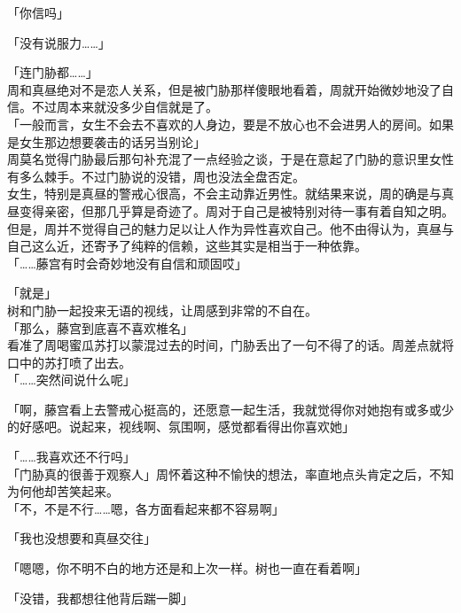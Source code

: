 「你信吗」

「没有说服力……」

「连门胁都……」\\

周和真昼绝对不是恋人关系，但是被门胁那样傻眼地看着，周就开始微妙地没了自信。不过周本来就没多少自信就是了。\\

「一般而言，女生不会去不喜欢的人身边，要是不放心也不会进男人的房间。如果是女生那边想要袭击的话另当别论」\\

周莫名觉得门胁最后那句补充混了一点经验之谈，于是在意起了门胁的意识里女性有多么棘手。不过门胁说的没错，周也没法全盘否定。\\

女生，特别是真昼的警戒心很高，不会主动靠近男性。就结果来说，周的确是与真昼变得亲密，但那几乎算是奇迹了。周对于自己是被特别对待一事有着自知之明。\\

但是，周并不觉得自己的魅力足以让人作为异性喜欢自己。他不由得认为，真昼与自己这么近，还寄予了纯粹的信赖，这些其实是相当于一种依靠。\\

「……藤宫有时会奇妙地没有自信和顽固哎」

「就是」\\

树和门胁一起投来无语的视线，让周感到非常的不自在。\\

「那么，藤宫到底喜不喜欢椎名」\\

看准了周喝蜜瓜苏打以蒙混过去的时间，门胁丢出了一句不得了的话。周差点就将口中的苏打喷了出去。\\

「……突然间说什么呢」

「啊，藤宫看上去警戒心挺高的，还愿意一起生活，我就觉得你对她抱有或多或少的好感吧。说起来，视线啊、氛围啊，感觉都看得出你喜欢她」

「……我喜欢还不行吗」\\

「门胁真的很善于观察人」周怀着这种不愉快的想法，率直地点头肯定之后，不知为何他却苦笑起来。\\

「不，不是不行……嗯，各方面看起来都不容易啊」

「我也没想要和真昼交往」

「嗯嗯，你不明不白的地方还是和上次一样。树也一直在看着啊」

「没错，我都想往他背后踹一脚」

